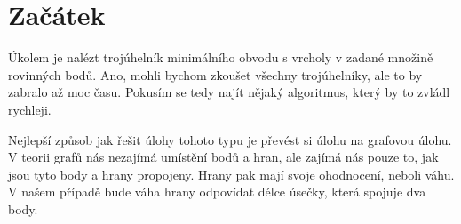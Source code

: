 \section{Začátek}
\label{sec:zacatek}


Úkolem je nalézt trojúhelník minimálního obvodu s vrcholy v zadané množině rovinných bodů. Ano, mohli bychom zkoušet všechny trojúhelníky, ale to by zabralo až moc času. Pokusím se tedy najít nějaký algoritmus, který by to zvládl rychleji.

Nejlepší způsob jak řešit úlohy tohoto typu je převést si úlohu na grafovou úlohu. V teorii grafů nás nezajímá umístění bodů a hran, ale zajímá nás pouze to, jak jsou tyto body a hrany propojeny. Hrany pak mají svoje ohodnocení, neboli váhu. V našem případě bude váha hrany odpovídat délce úsečky, která spojuje dva body.